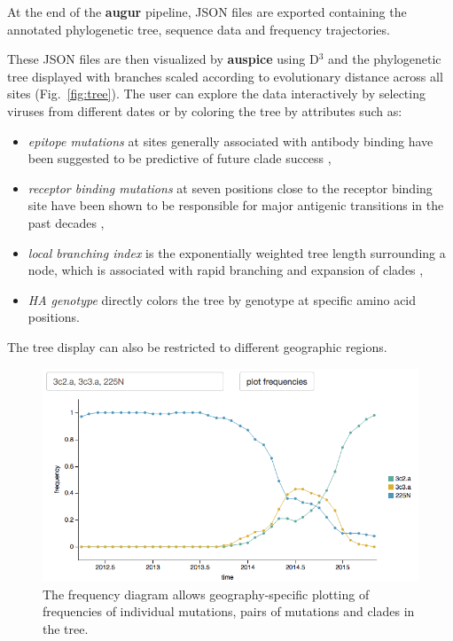 \documentclass{bioinfo}
\newcommand{\FIG}[1]{Fig.~\ref{fig:#1}}
\newcommand{\augur}{\textbf{augur}}
\newcommand{\auspice}{\textbf{auspice}}
\begin{document}
At the end of the \augur{} pipeline, JSON files are exported containing the annotated phylogenetic tree, sequence data and frequency trajectories.

These JSON files are then visualized by \auspice{} using D$^3$ \citep{bostock_d3_2011} and the phylogenetic tree displayed with branches scaled according to evolutionary distance across all sites (\FIG{tree}).
The user can explore the data interactively by selecting viruses from different dates or by coloring the tree by attributes such as:
\begin{itemize}
	\item \textit{epitope mutations} at sites generally associated with antibody binding have been suggested to be predictive of future clade success \citep{luksza_predictive_2014},
    \item \textit{receptor binding mutations} at seven positions close to the receptor binding site have been shown to be responsible for major antigenic transitions in the past decades \citep{koel_substitutions_2013},
    \item \textit{local branching index} is the exponentially weighted tree length surrounding a node, which is associated with rapid branching and expansion of clades \citep{neher_predicting_2014},
    \item \textit{HA genotype} directly colors the tree by genotype at specific amino acid positions.
\end{itemize}
The tree display can also be restricted to different geographic regions.

\begin{figure}[t]
	\centering
	\includegraphics[width=0.99\columnwidth]{frequencies}
	\caption[]{The frequency diagram allows geography-specific plotting of frequencies of individual mutations, pairs of mutations and clades in the tree.}
	\label{fig:freq}
\end{figure}
\end{document}

